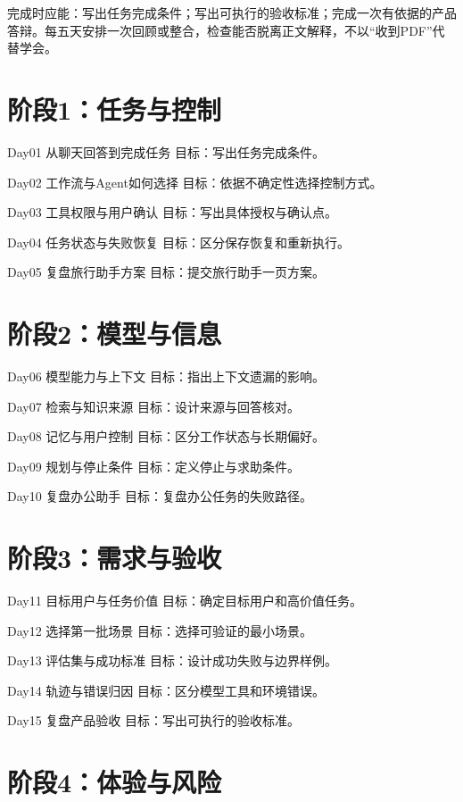 \documentclass[11pt]{article}
\newcommand{\Needspace}[1]{\par\ifdim\dimexpr\pagegoal-\pagetotal\relax<#1\relax\newpage\fi}
\begin{document}
完成时应能：写出任务完成条件；写出可执行的验收标准；完成一次有依据的产品答辩。每五天安排一次回顾或整合，检查能否脱离正文解释，不以“收到PDF”代替学会。

\Needspace{5\baselineskip}\section*{阶段1：任务与控制}

Day01  从聊天回答到完成任务
目标：写出任务完成条件。

Day02  工作流与Agent如何选择
目标：依据不确定性选择控制方式。

Day03  工具权限与用户确认
目标：写出具体授权与确认点。

Day04  任务状态与失败恢复
目标：区分保存恢复和重新执行。

Day05  复盘旅行助手方案
目标：提交旅行助手一页方案。

\Needspace{5\baselineskip}\section*{阶段2：模型与信息}

Day06  模型能力与上下文
目标：指出上下文遗漏的影响。

Day07  检索与知识来源
目标：设计来源与回答核对。

Day08  记忆与用户控制
目标：区分工作状态与长期偏好。

Day09  规划与停止条件
目标：定义停止与求助条件。

Day10  复盘办公助手
目标：复盘办公任务的失败路径。

\Needspace{5\baselineskip}\section*{阶段3：需求与验收}

Day11  目标用户与任务价值
目标：确定目标用户和高价值任务。

Day12  选择第一批场景
目标：选择可验证的最小场景。

Day13  评估集与成功标准
目标：设计成功失败与边界样例。

Day14  轨迹与错误归因
目标：区分模型工具和环境错误。

Day15  复盘产品验收
目标：写出可执行的验收标准。

\Needspace{5\baselineskip}\section*{阶段4：体验与风险}
\end{document}
